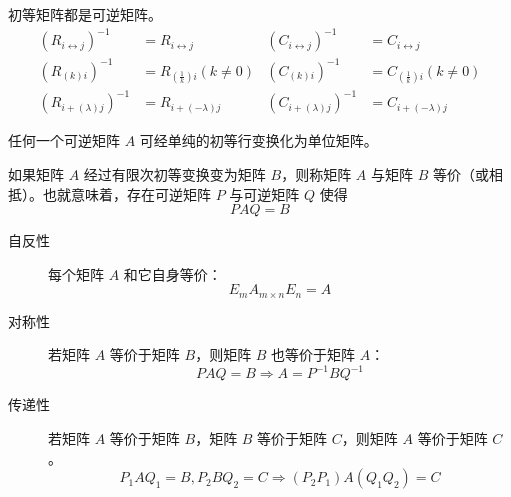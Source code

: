 \documentclass{ctexbook}
\begin{document}
\begin{proposition}[性质]
    初等矩阵都是可逆矩阵。
    \begin{equation}
        \begin{aligned}
            (R_{i\leftrightarrow j})^{-1}&=R_{i\leftrightarrow j} & (C_{i\leftrightarrow j})^{-1} &= C_{i\leftrightarrow j}\\
            (R_{(k)i})^{-1}&=R_{(\frac{1}{k})i}(k\neq 0)& (C_{(k)i})^{-1}&=C_{(\frac{1}{k})i}(k\neq 0)\\
            (R_{i+(\lambda)j})^{-1}&=R_{i+(-\lambda)j}& (C_{i+(\lambda)j})^{-1}&=C_{i+(-\lambda)j}
        \end{aligned}
    \end{equation}
\end{proposition}

\begin{theorem}[可逆矩阵充要条件]
    任何一个可逆矩阵 $A$ 可经单纯的初等行变换化为单位矩阵。
\end{theorem}

\begin{definition}[矩阵的等价]
    如果矩阵 $A$ 经过有限次初等变换变为矩阵 $B$，则称矩阵 $A$ 与矩阵 $B$ 等价（或相抵）。也就意味着，存在可逆矩阵 $P$ 与可逆矩阵 $Q$ 使得
    \begin{equation}
        PAQ=B
    \end{equation}
\end{definition}

\begin{proposition}[矩阵等价的性质]
    \begin{description}
        \item[自反性] 每个矩阵 $A$ 和它自身等价：
        \begin{equation}
            E_{m}A_{m\times n}E_n=A
        \end{equation}
        \item[对称性] 若矩阵 $A$ 等价于矩阵 $B$，则矩阵 $B$ 也等价于矩阵 $A$：
        \begin{equation}
            PAQ=B\Rightarrow A=P^{-1}BQ^{-1}
        \end{equation}
        \item[传递性] 若矩阵 $A$ 等价于矩阵 $B$，矩阵 $B$ 等价于矩阵 $C$，则矩阵 $A$ 等价于矩阵 $C$。
        \begin{equation}
            P_1AQ_1=B,P_2BQ_2=C\Rightarrow (P_2P_1)A(Q_1Q_2)=C
        \end{equation}
    \end{description}
\end{proposition}
\end{document}
